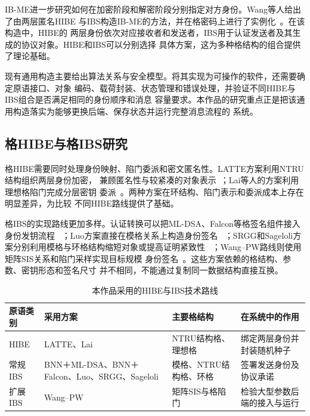 IB-ME进一步研究如何在加密阶段和解密阶段分别指定对方身份。Wang等人给出了由两层匿名HIBE
与IBS构造IB-ME的方法，并在格密码上进行了实例化~\cite{wang2024ibme}。在该构造中，HIBE的
两层身份依次对应接收者和发送者，IBS用于认证发送者及其生成的协议对象。HIBE和IBS可以分别选择
具体方案，这为多种格结构的组合提供了理论基础。

现有通用构造主要给出算法关系与安全模型。将其实现为可操作的软件，还需要确定原语接口、对象
编码、载荷封装、状态管理和错误处理，并验证不同HIBE与IBS组合是否满足相同的身份顺序和消息
容量要求。本作品的研究重点正是把该通用构造落实为能够更换后端、保存状态并运行完整消息流程的
系统。

\subsection{格HIBE与格IBS研究}

格HIBE需要同时处理身份映射、陷门委派和密文匿名性。LATTE方案利用NTRU结构组织两层身份加密，
兼顾匿名性与较紧凑的对象表示~\cite{zhao2024latte}；Lai等人的方案利用理想格陷门完成分层密钥
委派~\cite{lai2015trapdoors}。两种方案在环结构、陷门表示和委派成本上存在明显差异，为比较
不同HIBE路线提供了基础。

格IBS的实现路线更加多样。认证转换可以把ML-DSA、Falcon等格签名组件接入身份发钥流程
~\cite{galindo2006ibs,nist2024fips204,falcon2020}；Luo方案直接在模格关系上构造身份签名
~\cite{luo2024ibs}；SRGG和Sageloli方案分别利用模格与环格结构缩短对象或提高证明紧致性
~\cite{jia2025ibs,sageloli2023ibs}；Wang--PW路线则使用矩阵SIS关系和陷门采样实现目标规模
身份签名~\cite{wang2024ibme,pan2021ibs}。这些方案依赖的格结构、参数、密钥形态和签名尺寸
并不相同，不能通过复制同一数据结构直接互换。

\begin{table}[H]
\centering\small
\caption{本作品采用的HIBE与IBS技术路线}
\label{tab:intro-primitives}
\begin{tabularx}{\textwidth}{@{}>{\raggedright\arraybackslash}p{}>{\raggedright\arraybackslash}p{}>{\raggedright\arraybackslash}p{}>{\raggedright\arraybackslash}X@{}}
\toprule
\rowcolor{black!8} 原语类别 & 采用方案 & 主要格结构 & 在系统中的作用 \\
\midrule
HIBE & LATTE、Lai & NTRU结构格、理想格 & 绑定两层身份并封装随机种子 \\
常规IBS & BNN＋ML-DSA、BNN＋Falcon、Luo、SRGG、Sageloli & 模格、NTRU结构格、环格 & 签署发送身份及协议承诺 \\
扩展IBS & Wang--PW & 矩阵SIS与格陷门 & 检验大型参数后端的接入与运行 \\
\bottomrule
\end{tabularx}
\end{table}

